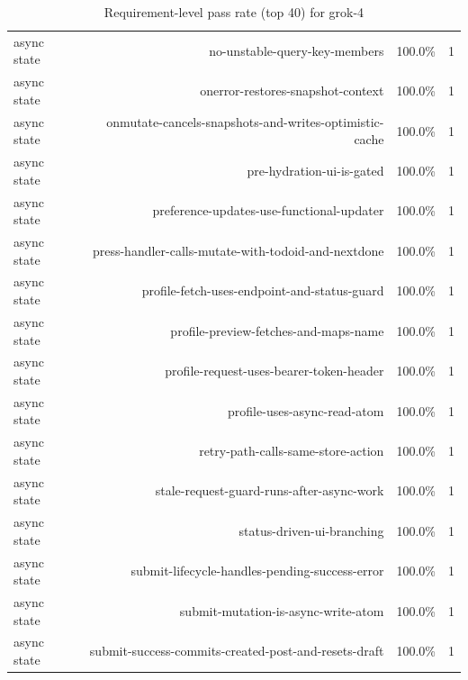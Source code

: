 \begin{table}[htbp]
\begin{tabular}{lrrr}
async state & no-unstable-query-key-members & 100.0\% & 1 \\
async state & onerror-restores-snapshot-context & 100.0\% & 1 \\
async state & onmutate-cancels-snapshots-and-writes-optimistic-cache & 100.0\% & 1 \\
async state & pre-hydration-ui-is-gated & 100.0\% & 1 \\
async state & preference-updates-use-functional-updater & 100.0\% & 1 \\
async state & press-handler-calls-mutate-with-todoid-and-nextdone & 100.0\% & 1 \\
async state & profile-fetch-uses-endpoint-and-status-guard & 100.0\% & 1 \\
async state & profile-preview-fetches-and-maps-name & 100.0\% & 1 \\
async state & profile-request-uses-bearer-token-header & 100.0\% & 1 \\
async state & profile-uses-async-read-atom & 100.0\% & 1 \\
async state & retry-path-calls-same-store-action & 100.0\% & 1 \\
async state & stale-request-guard-runs-after-async-work & 100.0\% & 1 \\
async state & status-driven-ui-branching & 100.0\% & 1 \\
async state & submit-lifecycle-handles-pending-success-error & 100.0\% & 1 \\
async state & submit-mutation-is-async-write-atom & 100.0\% & 1 \\
async state & submit-success-commits-created-post-and-resets-draft & 100.0\% & 1 \\
\bottomrule
\end{tabular}
\caption{Requirement-level pass rate (top 40) for grok-4}
\end{table}
